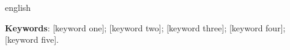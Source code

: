 %

\begin{resumo}[ABSTRACT]
 \begin{otherlanguage*}{english}

   \vspace{\onelineskip}
   \noindent
   \textbf{Keywords}: [keyword one]; [keyword two]; [keyword three];
   [keyword four]; [keyword five].
 \end{otherlanguage*}
\end{resumo}
